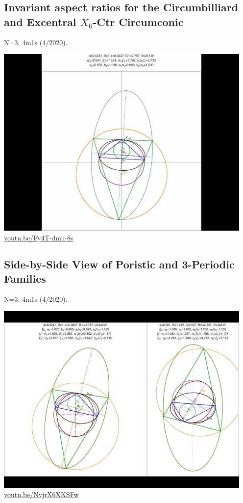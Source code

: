 \documentclass[12pt]{amsart}
\begin{document}
\subsection{Invariant aspect ratios for the Circumbilliard and Excentral $X_{6}$-Ctr Circumconic}
\label{vid:Fy4T-dmu-8s}
\noindent N=3, 4m1s (4/2020). 
\begin{center}\includegraphics[width=.5\textwidth]{pics/Fy4T-dmu-8s.jpg} \\ 
\href{https://youtu.be/Fy4T-dmu-8s}{\url{youtu.be/Fy4T-dmu-8s}}\end{center}
% 

\subsection{Side-by-Side View of Poristic and 3-Periodic Families}
\label{vid:NvjrX6XKSFw}
\noindent N=3, 4m1s (4/2020). 
\begin{center}\includegraphics[width=.5\textwidth]{pics/NvjrX6XKSFw.jpg} \\ 
\href{https://youtu.be/NvjrX6XKSFw}{\url{youtu.be/NvjrX6XKSFw}}\end{center}
% 
\end{document}
